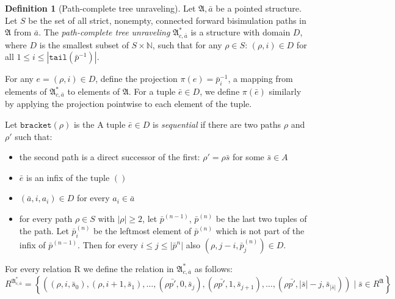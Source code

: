 \documentclass[draft]{scrartcl}
\theoremstyle{definition}
\newtheorem{definition}[theorem]{Definition}
\begin{document}
\begin{definition}[Path-complete tree unraveling]
  Let $\mathfrak{A}, \bar{a}$ be a pointed structure.
  Let $S$ be the set of all strict, nonempty, connected forward bisimulation paths in $\mathfrak{A}$ from $\bar{a}$.
  The \emph{path-complete tree unraveling} $\mathfrak{A}^{*}_{c,\bar{a}}$ is a structure with domain $D$, where $D$ is the smallest subset of $S \times \mathbb{N}$, such that for any $\rho \in S$: $(\rho, i) \in D$ for all $1 \leq i \leq |\mathtt{tail}(\bar{p}^{-1})|$.

  For any $e = (\rho, i) \in D$, define the projection $\pi(e) = \bar{p}^{-1}_{i}$, a mapping from elements of $\mathfrak{A}^{*}_{c,\bar{a}}$ to elements of $\mathfrak{A}$.
  For a tuple $\bar{e} \in D$, we define $\pi(\bar{e})$ similarly by applying the projection pointwise to each element of the tuple.

  Let  $\mathtt{bracket}(\rho)$ is the
  A tuple $\bar{e} \in D$ is \emph{sequential} if there are two paths $\rho$ and $\rho'$ such that:
  \begin{itemize}
    \item the second path is a direct successor of the first: $\rho' = \rho \bar{s}$ for some $\bar{s} \in A$
    \item $\bar{e}$ is an infix of the tuple $()$
  \end{itemize}



  \begin{itemize}
    \item $(\bar{a}, i, a_{i}) \in D$ for every $a_{i} \in \bar{a}$
    \item
          for every path $\rho \in S$ with $|\rho| \geq 2$, let $\bar{p}^{(n-1)}$, $\bar{p}^{(n)}$ be the last two tuples of the path.
          Let $\bar{p}^{(n)}_{i}$ be the leftmost element of $\bar{p}^{(n)}$ which is not part of the infix of  $\bar{p}^{(n-1)}$.
          Then for every $i \leq j \leq |\bar{p}^{n}|$ also $ (\rho, j-i, \bar{p}^{(n)}_{j}) \in D$.
  \end{itemize}

  For every relation R we define the relation in $\mathfrak{A}^{*}_{c,\bar{a}}$ as follows:
  \[
    R^{\mathfrak{A}^{*}_{c,\bar{a}}} = \left\{
      (
      (\rho, i, \bar{s}_{0}),
      (\rho, i+1, \bar{s}_{1}),
      \ldots,
      (\rho \bar{p'}, 0, \bar{s}_{j}),
      (\rho \bar{p'}, 1, \bar{s}_{j+1}),
      \ldots,
      (\rho \bar{p'}, |\bar{s}|-j, \bar{s}_{|\bar{s}|})
      )
      \mid
      \bar{s} \in R^{\mathfrak{A}}
    \right\}
  \]
\end{definition}
\end{document}
